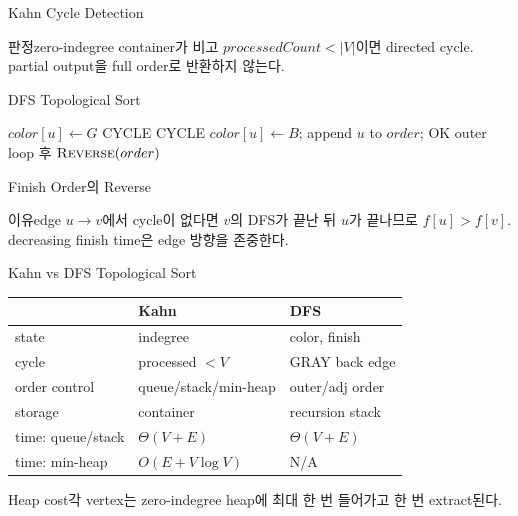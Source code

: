 \begin{frame}{Kahn Cycle Detection}
\centering{}
\begin{alertblock}{판정}zero-indegree container가 비고 \(processedCount<|V|\)이면 directed cycle. partial output을 full order로 반환하지 않는다.\end{alertblock}
\end{frame}
\begin{frame}{DFS Topological Sort}
\algofont\begin{algorithmic}[1]
\State \(color[u]\gets G\)
\State\Return CYCLE\EndIf
{}\State\Return CYCLE\EndIf\EndFor
\State \(color[u]\gets B\); append \(u\) to \(order\); \Return OK\EndFunction
\Statex outer loop 후 \(\Call{Reverse}{order}\)
\end{algorithmic}
\end{frame}
\begin{frame}{Finish Order의 Reverse}
\centering{}
\begin{block}{이유}edge \(u\to v\)에서 cycle이 없다면 \(v\)의 DFS가 끝난 뒤 \(u\)가 끝나므로 \(f[u]>f[v]\). decreasing finish time은 edge 방향을 존중한다.\end{block}
\end{frame}
\begin{frame}{Kahn vs DFS Topological Sort}
\scriptsize\centering\begin{tabular}{lll}\toprule&Kahn&DFS\\\midrule
state&indegree&color, finish\\cycle&processed \(<V\)&GRAY back edge\\order control&queue/stack/min-heap&outer/adj order\\storage&container&recursion stack\\
time: queue/stack&\(\Theta(V+E)\)&\(\Theta(V+E)\)\\
time: min-heap&\(O(E+V\log V)\)&N/A\\\bottomrule\end{tabular}
\begin{block}{Heap cost}각 vertex는 zero-indegree heap에 최대 한 번 들어가고 한 번 extract된다.\end{block}
\end{frame}
